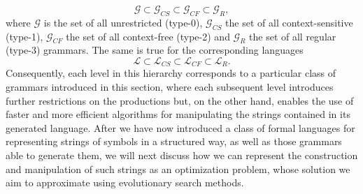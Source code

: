 \begin{equation}
	\mathcal{G} \subset \mathcal{G}_{CS} \subset \mathcal{G}_{CF} \subset \mathcal{G}_{R}, 
\end{equation} 
where $\mathcal{G}$ is the set of all unrestricted (type-0), $\mathcal{G}_{CS}$ the set of all context-sensitive (type-1), $\mathcal{G}_{CF}$ the set of all context-free (type-2) and $\mathcal{G}_{R}$ the set of all regular (type-3) grammars.
The same is true for the corresponding languages
\begin{equation}
	\mathcal{L} \subset \mathcal{L}_{CS} \subset \mathcal{L}_{CF} \subset \mathcal{L}_{R}. 
\end{equation}
Consequently, each level in this hierarchy corresponds to a particular class of grammars introduced in this section, where each subsequent level introduces further restrictions on the productions but, on the other hand, enables the use of faster and more efficient algorithms for manipulating the strings contained in its generated language.
After we have now introduced a class of formal languages for representing strings of symbols in a structured way, as well as those grammars able to generate them, we will next discuss how we can represent the construction and manipulation of such strings as an optimization problem, whose solution we aim to approximate using evolutionary search methods.